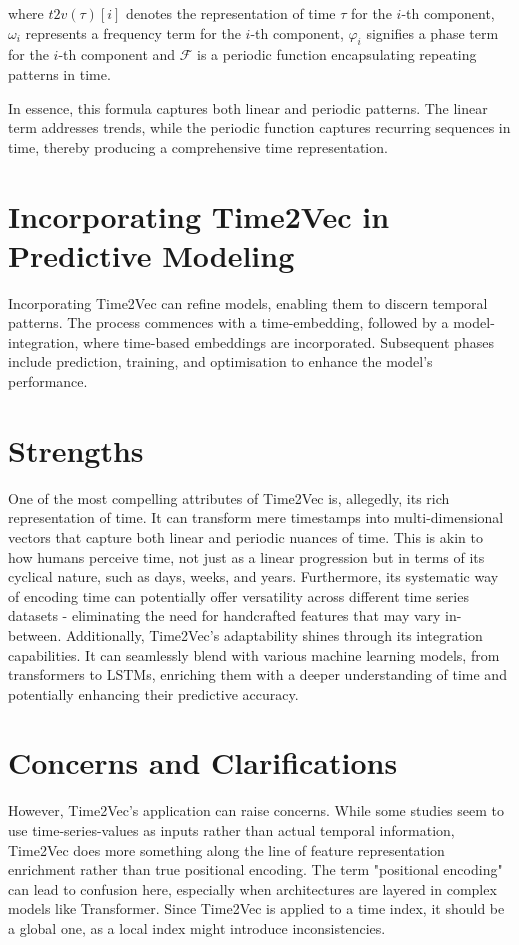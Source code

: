 \documentclass{tufte-handout}
\begin{document}
\noindent where \( t2v(\tau)[i] \) denotes the representation of time \( \tau \) for the \( i \)-th component, \( \omega_i \) represents a frequency term for the \( i \)-th component, \( \varphi_i \) signifies a phase term for the \( i \)-th component and \( \mathcal{F} \) is a periodic function encapsulating repeating patterns in time.

In essence, this formula captures both linear and periodic patterns. The linear term addresses trends, while the periodic function captures recurring sequences in time, thereby producing a comprehensive time representation.

\section{Incorporating Time2Vec in Predictive Modeling}

Incorporating Time2Vec can refine models, enabling them to discern temporal patterns. The process commences with a time-embedding, followed by a model-integration, where time-based embeddings are incorporated. Subsequent phases include prediction, training, and optimisation to enhance the model's performance.

\section{Strengths}

One of the most compelling attributes of Time2Vec is, allegedly, its rich representation of time. It can transform mere timestamps into multi-dimensional vectors that capture both linear and periodic nuances of time. This is akin to how humans perceive time, not just as a linear progression but in terms of its cyclical nature, such as days, weeks, and years. Furthermore, its systematic way of encoding time can potentially offer versatility across different time series datasets - eliminating the need for handcrafted features that may vary in-between. Additionally, Time2Vec's adaptability shines through its integration capabilities. It can seamlessly blend with various machine learning models, from transformers to LSTMs, enriching them with a deeper understanding of time and potentially enhancing their predictive accuracy.

\section{Concerns and Clarifications}

However, Time2Vec's application can raise concerns. While some studies\cite{word2vec} seem to use time-series-values as inputs rather than actual temporal information, Time2Vec does more something along the line of feature representation enrichment rather than true positional encoding. The term "positional encoding" can lead to confusion here, especially when architectures are layered in complex models like Transformer. Since Time2Vec is applied to a time index, it should be a global one, as a local index might introduce inconsistencies.
\end{document}
